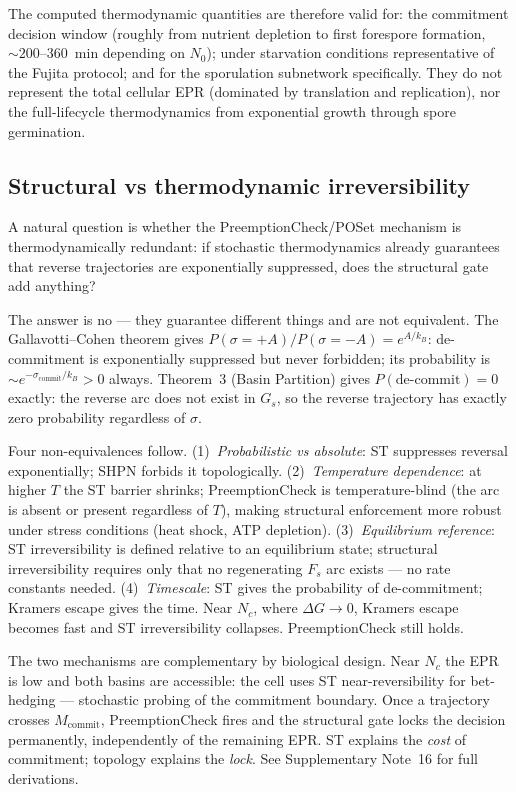 \documentclass[11pt,a4paper]{article}
\begin{document}
The computed thermodynamic quantities are therefore valid for:
the commitment decision window (roughly from nutrient depletion to first
forespore formation, $\sim 200$--$360$~min depending on $N_0$);
under starvation conditions representative of the Fujita protocol;
and for the sporulation subnetwork specifically.
They do not represent the total cellular EPR (dominated by translation and
replication), nor the full-lifecycle thermodynamics from exponential growth
through spore germination.

\subsection{Structural vs thermodynamic irreversibility}
\label{sec:structural_vs_thermal_irreversibility}

A natural question is whether the PreemptionCheck/POSet mechanism is
thermodynamically redundant: if stochastic thermodynamics already guarantees
that reverse trajectories are exponentially suppressed, does the structural
gate add anything?

The answer is no --- they guarantee different things and are not equivalent.
The Gallavotti--Cohen theorem gives
$P(\sigma=+A)/P(\sigma=-A) = e^{A/k_B}$:
de-commitment is exponentially suppressed but never forbidden; its probability
is $\sim e^{-\sigma_{\text{commit}}/k_B} > 0$ always.
Theorem~3 (Basin Partition) gives $P(\text{de-commit}) = 0$ exactly: the
reverse arc does not exist in $G_s$, so the reverse trajectory has exactly
zero probability regardless of $\sigma$.

Four non-equivalences follow.
(1)~\emph{Probabilistic vs absolute}: ST suppresses reversal exponentially;
SHPN forbids it topologically.
(2)~\emph{Temperature dependence}: at higher $T$ the ST barrier shrinks;
PreemptionCheck is temperature-blind (the arc is absent or present
regardless of $T$), making structural enforcement more robust under
stress conditions (heat shock, ATP depletion).
(3)~\emph{Equilibrium reference}: ST irreversibility is defined relative to
an equilibrium state; structural irreversibility requires only that no
regenerating $F_s$ arc exists --- no rate constants needed.
(4)~\emph{Timescale}: ST gives the probability of de-commitment; Kramers
escape gives the time.  Near $N_c$, where $\Delta G \to 0$, Kramers escape
becomes fast and ST irreversibility collapses.  PreemptionCheck still holds.

The two mechanisms are complementary by biological design.  Near $N_c$ the
EPR is low and both basins are accessible: the cell uses ST near-reversibility
for bet-hedging --- stochastic probing of the commitment boundary.  Once a
trajectory crosses $M_{\text{commit}}$, PreemptionCheck fires and the
structural gate locks the decision permanently, independently of the remaining
EPR.  ST explains the \emph{cost} of commitment; topology explains the
\emph{lock}.  See Supplementary Note~16 for full derivations.
\end{document}

